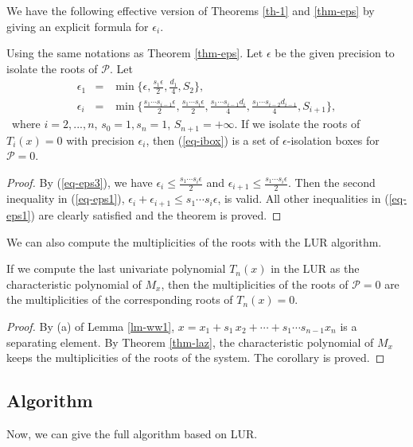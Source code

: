 \documentclass[amsthm]{JSC_LaTex_2007_Mar_12/elsart}
\def\bref#1{(\ref{#1})}
\def\PS{ {\mathcal{P}} }
\begin{document}
We have the following effective version of Theorems \ref{th-1} and
\ref{thm-eps} by giving an explicit formula for $\epsilon_i$.
\begin{thm} \label{thm-eps1} Using the same notations as Theorem \ref{thm-eps}.
Let $\epsilon$ be the given precision to isolate the roots of
$\mathcal{P}$.
Let
\begin{eqnarray}\label{eq-eps3}
 \epsilon_1 &=& \min\{\epsilon,\frac{s_1\epsilon}{2},\frac{d_{1}}{4},
 S_{2}\},\nonumber\\
\epsilon_i&=&\min\{\frac{s_1\cdots
s_{i-1}\epsilon}{2},\frac{s_1\cdots s_i\epsilon}{2},
     \frac{s_1\cdots s_{i-1}d_{i}}{4}, \frac{s_1\cdots s_{i-2}d_{i-1}}{4}, S_{i+1}\},
\end{eqnarray}\
where $i=2,...,n$, $s_0=1,s_n=1$, $S_{n+1}=+\infty$.
If we isolate the roots of $T_i(x)=0$ with precision $\epsilon_i$,
then  \bref{eq-ibox} is a set of $\epsilon$-isolation boxes  for
$\PS=0$.
\end{thm}
\begin{proof}
By \bref{eq-eps3}, we have
 $\epsilon_i\le\frac{s_1\cdots s_{i}\epsilon}{2}$ and
 $\epsilon_{i+1}\le\frac{s_1\cdots s_{i}\epsilon}{2}$.
Then the second inequality in \bref{eq-eps1},
$\epsilon_i+\epsilon_{i+1}\le s_1\cdots s_i \epsilon$, is valid. All
other inequalities in \bref{eq-eps1} are clearly satisfied and the
theorem is proved.
\end{proof}

We can also compute the multiplicities of the roots with the LUR
algorithm.

\begin{cor}
If we compute the last univariate polynomial $T_n(x)$ in the LUR as
the characteristic polynomial of $M_x$, then the multiplicities of
the roots of $\PS=0$ are the multiplicities of the corresponding
roots of $T_n(x)=0$.
\end{cor}
\begin{proof}
By (a) of Lemma \ref{lm-ww1}, $x = x_1+s_1\,x_2+\cdots+s_1\cdots
s_{n-1}x_n$ is a separating element. By Theorem \ref{thm-laz}, the
characteristic polynomial of $M_x$ keeps the multiplicities of the
roots of the system. The corollary is proved.
\end{proof}

\subsection{Algorithm}

Now, we can give the full algorithm based on LUR.
\end{document}
